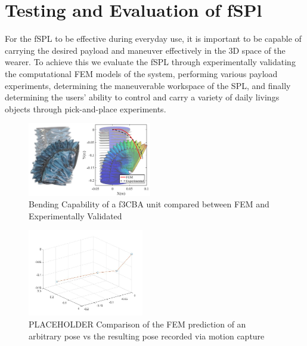\documentclass[letterpaper, 10 pt, conference]{ieeeconf}  %
\begin{document}
\section{Testing and Evaluation of fSPl}
For the fSPL to be effective during everyday use, it is important to be capable of carrying the desired payload and maneuver effectively in the 3D space of the wearer. To achieve this we evaluate the fSPL through experimentally validating the computational FEM models of the system, performing various payload experiments, determining the maneuverable workspace of the SPL, and finally determining the users' ability to control and carry a variety of daily livings objects through pick-and-place experiments.
% 
% 



\begin{figure}[b!]
\centering
\includegraphics[width=0.48\textwidth]{Figures/fem_real_v4}
\caption{Bending Capability of a f3CBA unit compared between FEM and Experimentally Validated}
\label{fig:f3CAs_bend_fem_real}
\vspace{-1.5em}
\end{figure}


\begin{figure}[t!]
\centering
\includegraphics[width=0.45\textwidth]{Figures/SnakePose.jpg}
\caption{PLACEHOLDER Comparison of the FEM prediction of an arbitrary pose vs the resulting pose recorded via motion capture}
\label{fig:pose}
\end{figure}
\end{document}
